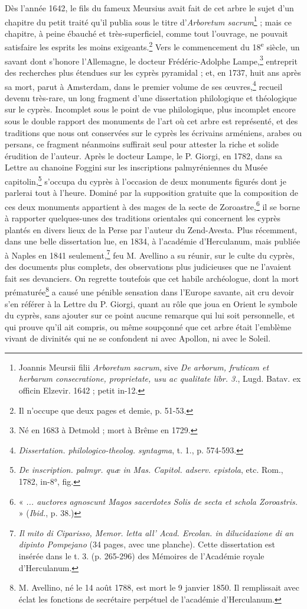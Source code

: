 \documentclass{article}
\begin{document}
Dès l'année 1642, le fils du fameux Meursius avait fait de cet arbre le sujet d'un chapitre du petit traité qu'il publia sous le titre d'\emph{Arboretum sacrum}\footnote{Joannis Meursii filii \emph{Arboretum sacrum}, sive \emph{De arborum, fruticam et herbarum consecratione, proprietate, usu ac qualitate libr. 3.}, Lugd. Batav. ex officin Elzevir. 1642 ; petit in-12.} ; mais ce chapitre, à peine ébauché et très-superficiel, comme tout l'ouvrage, ne pouvait satisfaire les esprits les moins exigeants.\footnote{Il n'occupe que deux pages et demie, p. 51-53.} Vers le commencement du 18\textsuperscript{e} siècle, un savant dont s'honore l'Allemagne, le docteur Frédéric-Adolphe Lampe,\footnote{Né en 1683 à Detmold ; mort à Brême en 1729.} entreprit des recherches plus étendues sur les cyprès pyramidal ; et, en 1737, huit ans après sa mort, parut à Amsterdam, dans le premier volume de ses œuvres,\footnote{\emph{Dissertation. philologico-theolog. syntagma}, t. 1., p. 574-593.} recueil devenu très-rare, un long fragment d'une dissertation philologique et théologique sur le cyprès. Incomplet sous le point de vue philologique, plus incomplet encore sous le double rapport des monuments de l'art où cet arbre est représenté, et des traditions que nous ont conservées sur le cyprès les écrivains arméniens, arabes ou persans, ce fragment néanmoins suffirait seul pour attester la riche et solide érudition de l'auteur. Après le docteur Lampe, le P. Giorgi, en 1782, dans sa Lettre au chanoine Foggini sur les inscriptions palmyréniennes du Musée capitolin,\footnote{\emph{De inscription. palmyr. quæ in Mas. Capitol. adserv. epistola}, etc. Rom., 1782, in-8°, fig.} s'occupa du cyprès à l'occasion de deux monuments figurés dont je parlerai tout à l'heure. Dominé par la supposition gratuite que la composition de ces deux monuments appartient à des mages de la secte de Zoroastre,\footnote{« \emph{... auctores agnoscunt Magos sacerdotes Solis de secta et schola Zoroastris.} » (\emph{Ibid.}, p. 38.)} il se borne à rapporter quelques-unes des traditions orientales qui concernent les cyprès plantés en divers lieux de la Perse par l'auteur du Zend-Avesta. Plus récemment, dans une belle dissertation lue, en 1834, à l'académie d'Herculanum, mais publiée à Naples en 1841 seulement,\footnote{\emph{Il mito di Ciparisso, Memor. letta all' Acad. Ercolan. in dilucidazione di an dipinto Pompejano} (34 pages, avec une planche). Cette dissertation est insérée dans le t. 3. (p. 265-296) des Mémoires de l'Académie royale d'Herculanum.} feu M. Avellino a su réunir, sur le culte du cyprès, des documents plus complets, des observations plus judicieuses que ne l'avaient fait ses devanciers. On regrette toutefois que cet habile archéologue, dont la mort prématurée\footnote{M. Avellino, né le 14 août 1788, est mort le 9 janvier 1850. Il remplissait avec éclat les fonctions de secrétaire perpétuel de l'académie d'Herculanum.} a causé une pénible sensation dans l'Europe savante, ait cru devoir s'en référer à la Lettre du P. Giorgi, quant au rôle que joua en Orient le symbole du cyprès, sans ajouter sur ce point aucune remarque qui lui soit personnelle, et qui prouve qu'il ait compris, ou même soupçonné que cet arbre était l'emblème vivant de divinités qui ne se confondent ni avec Apollon, ni avec le Soleil.
\end{document}
